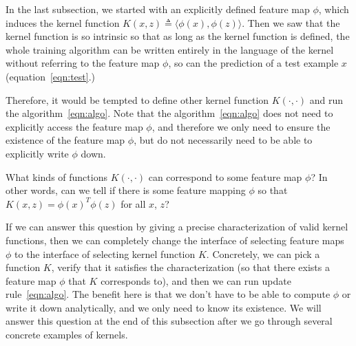 \documentclass{article}
\begin{document}
%


In the last subsection, we started with an explicitly defined feature map $\phi$, which induces the kernel function $K(x,z) \triangleq 	\langle\phi(x), \phi(z)\rangle$. Then we saw that the kernel function is so intrinsic so that as long as the kernel function is defined,  the whole training algorithm can be written entirely in the language of the kernel without referring to the feature map $\phi$, so can the prediction of a test example $x$ (equation~\eqref{eqn:test}.)

Therefore, it would be tempted to define other kernel function $K(\cdot, \cdot)$ and run the algorithm~\eqref{eqn:algo}. Note that the algorithm~\eqref{eqn:algo} does not need to explicitly access the feature map $\phi$, and therefore we only need to ensure the existence of the feature map $\phi$, but do not necessarily need to be able to explicitly write $\phi$ down. 

What kinds of functions $K(\cdot, \cdot)$ can correspond to some feature map $\phi$? In other words, can we tell if there is some feature mapping $\phi$ so that $K(x,z) = \phi(x)^T \phi(z)$
for all $x$, $z$?

 If we can answer this question by giving a precise characterization of valid kernel functions, then we can completely change the interface of selecting feature maps $\phi$ to the interface of selecting kernel function $K$. Concretely, we can pick a function $K$, verify that it satisfies the characterization (so that there exists a feature map $\phi$ that $K$ corresponds to), and then we can run update rule~\eqref{eqn:algo}. The benefit here is that we don't have to be able to compute $\phi$ or write it down analytically, and we only need to know its existence.
  We will answer this question at the end of this subsection after we go through several concrete examples of kernels. 
\end{document}
